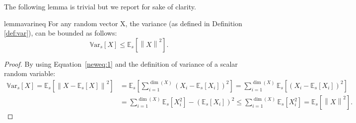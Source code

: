 \documentclass{article}
\theoremstyle{remark}
\theoremstyle{definition}
\newcommand{\norm}[2][\infty]{\left\|#2\right\|_{#1}}
\newcommand{\Es}[1]{\mathbb{E}_{s}\left[#1\right]}
\newcommand{\Vars}[1]{{\mathbb{V}\text{ar}}_{s}\left[#1\right]}
\begin{document}
The following lemma is trivial but we report for sake of clarity.

\begin{restatable}{lemma}{varineq}\label{lemma:varineq}
For any random vector X, the variance (as defined in Definition \ref{def:var}), can be bounded as follows:
\[
	\Vars{X} \leq \Es{\norm[]{X}^2}.
\]
\end{restatable}
\begin{proof}
        By using Equation~\eqref{neweq:1} and the definition of variance of a scalar random variable:
\begin{align*}
	\Vars{X} = \Es{\norm[]{X-\Es{X}}^2} &= \Es{\sum_{i=1}^{\dim(X)}\left(X_i-\Es{X_i}\right)^2} = \sum_{i=1}^{\dim(X)}\Es{\left(X_i-\Es{X_i}\right)^2} \\
                                     &=\sum_{i=1}^{\dim(X)} \Es{X_i^2} - \left(\Es{X_i} \right)^2 \leq \sum_{i=1}^{\dim(X)}\Es{X_i^2}
                                        = \Es{\norm[]{X}^2}.
\end{align*}
\end{proof}
\end{document}
